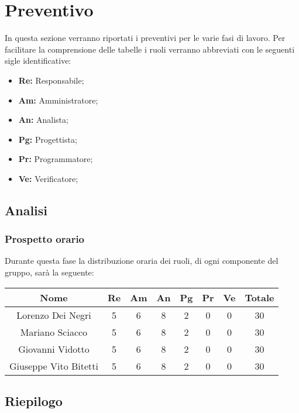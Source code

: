 \section{Preventivo}
	In questa sezione verranno riportati i preventivi per le varie fasi di lavoro. Per facilitare la comprensione delle tabelle i ruoli verranno abbreviati con le seguenti sigle identificative:
			\begin{itemize}
			\item\textbf{Re:} Responsabile;
			\item\textbf{Am:} Amministratore;
			\item\textbf{An:} Analista;
			\item\textbf{Pg:} Progettista;
			\item\textbf{Pr:} Programmatore;
			\item\textbf{Ve:} Verificatore;
		\end{itemize}
	\subsection{Analisi}
		\subsubsection{Prospetto orario}
			Durante questa fase la distribuzione oraria dei ruoli, di ogni componente del gruppo, sarà la seguente:
			

			\begin{longtable}{|c|c|c|c|c|c|c|c}
				\hline
				\rowcolor{lighter-grayer}
				\textbf{Nome} & \textbf{Re} & \textbf{Am} & \textbf{An} & \textbf{Pg}  & \textbf{Pr}   & \textbf{Ve} & \textbf{Totale} \\
				\hline
				\endfirsthead
				
				\hline
				Lorenzo Dei Negri & 5 &6 & 8 & 2 & 0 & 0 & 30\\
				\hline
				\hline
				Mariano Sciacco & 5 &6 & 8 & 2 & 0 & 0 & 30\\
				\hline
				\hline
				Giovanni Vidotto & 5 &6 & 8 & 2 & 0 & 0 & 30\\
				\hline
				\hline
				Giuseppe Vito Bitetti & 5 &6 & 8 & 2 & 0 & 0 & 30\\
				\hline
				
			\end{longtable}
			
		
		
		
	\subsection{Riepilogo}